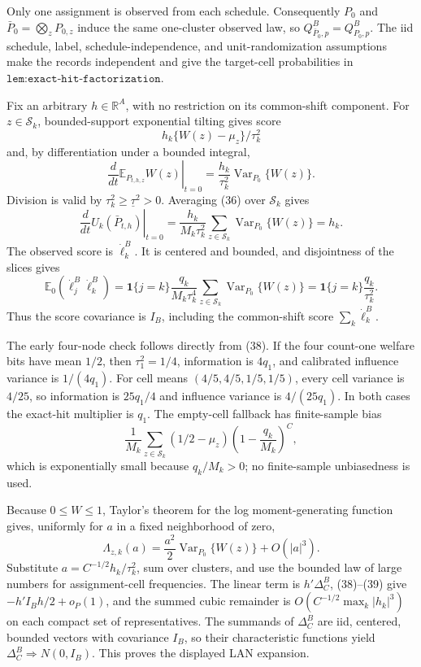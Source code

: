 Only one assignment is observed from each schedule.  Consequently \(P_0\) and \(\bar P_0=\bigotimes_zP_{0,z}\) induce the same one-cluster observed law, so \(Q^B_{\bar P_0,p}=Q^B_{P_0,p}\).  The iid schedule, label, schedule-independence, and unit-randomization assumptions make the records independent and give the target-cell probabilities in \(\texttt{lem:exact-hit-factorization}\).

Fix an arbitrary \(h\in\mathbb R^A\), with no restriction on its common-shift component.  For \(z\in\mathcal S_k\), bounded-support exponential tilting gives score
\[
 h_k\{W(z)-\mu_z\}/\tau_k^2
\]
and, by differentiation under a bounded integral,
\[
 \left.\frac d{dt}\mathbb E_{P_{t,h,z}}W(z)\right|_{t=0}
 =\frac{h_k}{\tau_k^2}\operatorname{Var}_{P_0}\{W(z)\}. \tag{36}
\]
Division is valid by \(\tau_k^2\geq\underline\tau^2>0\).  Averaging (36) over \(\mathcal S_k\) gives
\[
 \left.\frac d{dt}U_k(\bar P_{t,h})\right|_{t=0}
 =\frac{h_k}{M_k\tau_k^2}\sum_{z\in\mathcal S_k}
 \operatorname{Var}_{P_0}\{W(z)\}=h_k. \tag{37}
\]
The observed score is \(\dot\ell_k^B\).  It is centered and bounded, and disjointness of the slices gives
\[
 \mathbb E_0(\dot\ell_j^B\dot\ell_k^B)
 =\mathbf1\{j=k\}\frac{q_k}{M_k\tau_k^4}
 \sum_{z\in\mathcal S_k}\operatorname{Var}_{P_0}\{W(z)\}
 =\mathbf1\{j=k\}\frac{q_k}{\tau_k^2}. \tag{38}
\]
Thus the score covariance is \(I_B\), including the common-shift score \(\sum_k\dot\ell_k^B\).

The early four-node check follows directly from (38).  If the four count-one welfare bits have mean \(1/2\), then \(\tau_1^2=1/4\), information is \(4q_1\), and calibrated influence variance is \(1/(4q_1)\).  For cell means \((4/5,4/5,1/5,1/5)\), every cell variance is \(4/25\), so information is \(25q_1/4\) and influence variance is \(4/(25q_1)\).  In both cases the exact-hit multiplier is \(q_1\).  The empty-cell fallback has finite-sample bias
\[
 \frac1{M_k}\sum_{z\in\mathcal S_k}(1/2-\mu_z)
 \left(1-\frac{q_k}{M_k}\right)^C,
\]
which is exponentially small because \(q_k/M_k>0\); no finite-sample unbiasedness is used.

Because \(0\leq W\leq1\), Taylor's theorem for the log moment-generating function gives, uniformly for \(a\) in a fixed neighborhood of zero,
\[
 \Lambda_{z,k}(a)=\frac{a^2}{2}\operatorname{Var}_{P_0}\{W(z)\}+O(|a|^3). \tag{39}
\]
Substitute \(a=C^{-1/2}h_k/\tau_k^2\), sum over clusters, and use the bounded law of large numbers for assignment-cell frequencies.  The linear term is \(h'\Delta_C^B\), (38)--(39) give \(-h'I_Bh/2+o_P(1)\), and the summed cubic remainder is \(O(C^{-1/2}\max_k|h_k|^3)\) on each compact set of representatives.  The summands of \(\Delta_C^B\) are iid, centered, bounded vectors with covariance \(I_B\), so their characteristic functions yield \(\Delta_C^B\Rightarrow N(0,I_B)\).  This proves the displayed LAN expansion.

